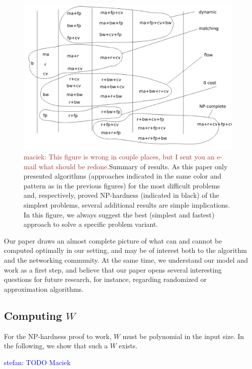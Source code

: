 \documentclass[9pt]{sigcomm-alternate}
\newcommand{\maciek}[1]{\textcolor{brown}{maciek: #1}}
\newcommand{\stefan}[1]{\textcolor{blue}{stefan: #1}}
\begin{document}
\begin{figure}
\includegraphics[width=\columnwidth]{figs/summary}
\caption{\maciek{This figure is wrong in couple places, but I sent you an e-mail what should be redone.}Summary of results. As this paper only presented algorithms (approaches indicated in the same
color and pattern as in the previous figures) for the most
difficult problems and, respectively, proved NP-hardness (indicated in black) of the simplest
problems, several additional results are simple implications. In this figure,
we always suggest the best (simplest and fastest) approach to solve a specific problem variant.}
\label{fig:summary}
\end{figure}




Our paper draws an almost complete picture of what can and cannot be
computed optimally in our setting, and may be of interest both to the algorithm
and the networking community. At the same time, we understand our model and work
as a first step, and believe that our paper opens several interesting
questions for future research, for instance, regarding randomized 
or approximation algorithms.


%



\begin{appendix}



\section{Computing $W$}\label{ap:w}

For the NP-hardness proof to work, $W$ must be polynomial in the input size.
In the following, we show that such a $W$ exists.

\stefan{TODO Maciek}

\end{appendix}
\end{document}
